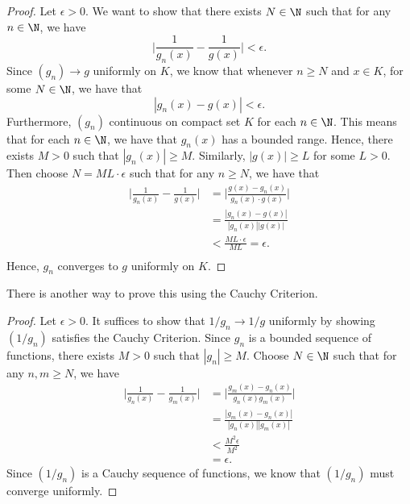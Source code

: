 \begin{proof}
Let \( \epsilon > 0  \). We want to show that there exists \( N \in \N  \) such that for any \( n \in \N  \), we have 
\[  \Big| \frac{ 1 }{ g_n(x)  } - \frac{ 1 }{ g(x)  }  \Big| < \epsilon.  \]
Since \( (g_n) \to g  \) uniformly on \( K  \), we know that whenever \( n \geq N  \) and \( x \in K  \), for some \( N \in \N  \), we have that 
\[  | g_n(x) - g(x)  | < \epsilon. \]
Furthermore, \( (g_n)  \) continuous on compact set \( K  \) for each \( n \in \N  \). This means that for each \( n \in \N  \), we have that \( g_n(x)  \) has a bounded range. Hence, there exists \( M > 0  \) such that \( | g_n(x)  | \geq M   \). Similarly, \( | g(x)  | \geq L  \) for some \( L > 0 \). Then choose \( N = ML \cdot \epsilon   \) such that for any \( n \geq N  \), we have that 
\begin{align*}
    \Big| \frac{ 1 }{ g_n(x)  } - \frac{ 1 }{ g(x)  }  \Big| &= \Big| \frac{ g(x) - g_n(x)  }{ g_n(x) \cdot g(x) }  \Big|   \\
                                                             &= \frac{ | g_n(x) - g(x)  |  }{ | g_n(x)  | | g(x)  |  }  \\
                                                             &< \frac{ ML \cdot \epsilon  }{ ML  } = \epsilon. \\ 
\end{align*}
Hence, \( g_n  \) converges to \( g  \) uniformly on \( K  \).
\end{proof}

        There is another way to prove this using the Cauchy Criterion.
        \begin{proof}
        Let \( \epsilon > 0  \). It suffices to show that \( 1/g_n  \to 1/g \) uniformly by showing \( (1/g_n)  \) satisfies the Cauchy Criterion. Since \( g_n  \) is a bounded sequence of functions, there exists \( M > 0  \) such that \( | g_n | \geq M    \). Choose \( N \in \N  \) such that for any \( n,m \geq N  \), we have 
        \begin{align*}
            \Big| \frac{ 1 }{ g_n(x) } - \frac{ 1 }{ g_m(x) }  \Big| &= \Big| \frac{ g_m(x) - g_n(x)  }{ g_n(x) g_m(x) }  \Big|  \\
                                                               &= \frac{ | g_m(x) - g_n(x)  |  }{ | g_n(x)  | | g_m(x) |  } \\
                                                               &< \frac{ M^2 \epsilon  }{ M^2  } \\
                                                               &= \epsilon.
        \end{align*}
        Since \( (1/g_n)  \) is a Cauchy sequence of functions, we know that \( (1/g_n)  \) must converge uniformly.
        \end{proof}
